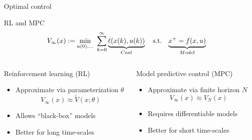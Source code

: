 \documentclass[xcolor=dvipsnames,aspectratio=169]{beamer}
\begin{document}
\begin{frame}{Optimal control}
	
\end{frame}

\begin{frame}{RL and MPC}
	\begin{equation*}
		V_{\infty}(x) := \min_{u(0),\dots} \ \sum_{k=0}^{\infty} 
		\underbrace{\ell(x(k),u(k))}_{Cost} \quad 
		\textnormal{s.t. } \ \underbrace{x^+ 
		= f(x,u)}_{Model}
	\end{equation*}
	\begin{columns}
		\begin{column}{0.45\linewidth}
			\begin{block}{Reinforcement learning (RL)}
				\begin{itemize}
					\item Approximate via parameterization $\theta$
					\begin{equation*}
						V_{\infty}(x) \approx \tilde{V}(x;\theta)
					\end{equation*}
					\item Allows ``black-box'' models
					\item Better for long time-scales
				\end{itemize}
			\end{block}
		\end{column}
		\begin{column}{0.45\linewidth}
			\begin{block}{Model predictive control (MPC)}
				\begin{itemize}
					\item Approximate via finite horizon $N$
					\begin{equation*}
						V_{\infty}(x) \approx V_{N}(x)
					\end{equation*}
					\item Requires differentiable models
					\item Better for short time-scales
				\end{itemize}
			\end{block}
		\end{column}
	\end{columns}
\end{frame}
\end{document}
